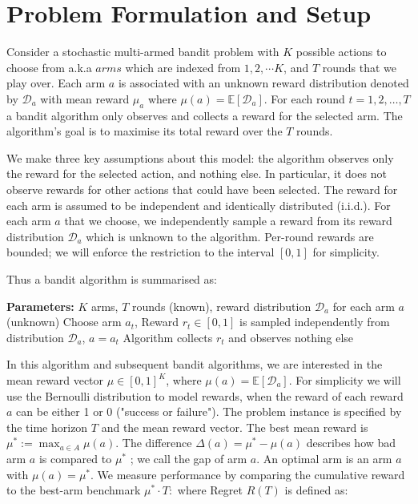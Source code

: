 \documentclass[12pt]{article}
\begin{document}
\section{Problem Formulation and Setup}

Consider a stochastic multi-armed bandit problem with $K$ possible actions to choose from a.k.a $arms$ which are indexed from $1, 2, \cdots K$, and $T$ rounds that we play over. Each arm $a$ is associated with an unknown reward distribution denoted by $\mathcal{D}_a$ with mean reward $\mu_a$ where $\mu(a) = \mathbb{E}[\mathcal{D}_a]$. For each round $t = 1,2,\dots,T$ a bandit algorithm only observes and collects a reward for the selected arm. The algorithm’s goal is to maximise its total reward over the $T$ rounds. 

We make three key assumptions about this model: the algorithm observes only the reward for the selected action, and nothing else. In particular, it does not observe rewards for other actions that could have been selected. The reward for each arm is assumed to be independent and identically distributed (i.i.d.). For each arm $a$ that we choose, we independently sample a reward from its reward distribution $\mathcal{D}_a$ which is unknown to the algorithm. Per-round rewards are bounded; we will enforce the restriction to the interval $[0, 1]$ for simplicity.

Thus a bandit algorithm is summarised as:

\begin{algorithm}
	\caption{Stochastic Bandits}
	\begin{algorithmic}
	\STATE \textbf{Parameters:} $K$ arms, $T$ rounds (known), reward distribution $\mathcal{D}_a$ for each arm $a$  (unknown)
	    \STATE Choose arm $a_t$,
	    \STATE Reward $r_t \in [0, 1]$ is sampled independently from distribution $\mathcal{D}_a$, $a = a_t$
	    \STATE Algorithm collects $r_t$ and observes nothing else
	\ENDFOR
	\end{algorithmic}
\end{algorithm}

In this algorithm and subsequent bandit algorithms, we are interested in the mean reward vector $\mu \in [0,1]^K$, where $\mu(a) = \mathbb{E}[\mathcal{D}_a]$. For simplicity we will use the Bernoulli distribution to model rewards, when the reward of each reward $a$ can be either 1 or 0 ("success or failure"). The problem instance is specified by the time horizon $T$ and the mean reward vector. The best mean reward is $\mu^* := \max_{a \in A} \mu(a)$. The difference $\Delta (a) = \mu^*  - \mu(a)$ describes how bad arm $a$ is compared to $\mu^*$ ; we call the gap of arm $a$. An optimal arm is an arm $a$ with $\mu(a) = \mu^*$. We measure performance by comparing the cumulative reward to the best-arm benchmark $\mu^*  \cdot T:$  where Regret $R(T)$ is defined as: 
\end{document}
